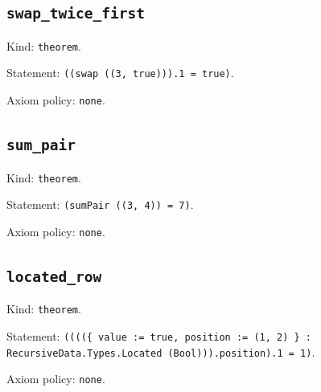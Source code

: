 \documentclass[11pt]{article}
\begin{document}
\subsection*{\texttt{swap\_twice\_first}}
\noindent Kind: \texttt{theorem}.\par
\noindent Statement: \texttt{((swap ((3, true))).1 = true)}.\par
\noindent Axiom policy: \texttt{none}.\par
\subsection*{\texttt{sum\_pair}}
\noindent Kind: \texttt{theorem}.\par
\noindent Statement: \texttt{(sumPair ((3, 4)) = 7)}.\par
\noindent Axiom policy: \texttt{none}.\par
\subsection*{\texttt{located\_row}}
\noindent Kind: \texttt{theorem}.\par
\noindent Statement: \texttt{((((\{ value := true, position := (1, 2) \} : RecursiveData.Types.Located (Bool))).position).1 = 1)}.\par
\noindent Axiom policy: \texttt{none}.\par
\end{document}
